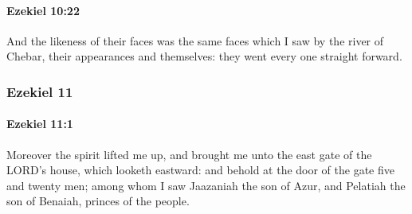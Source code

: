 		\paragraph{Ezekiel 10:22} %
			\label{EZEKIEL-10-22}

			And the likeness of their faces was the same faces which I saw by the river of Chebar, their appearances and themselves: they went every one straight forward.

	\subsubsection{Ezekiel 11} %
		\label{EZEKIEL-11}

		\paragraph{Ezekiel 11:1} %
			\label{EZEKIEL-11-1}

			Moreover the spirit lifted me up, and brought me unto the east gate of the LORD’s house, which looketh eastward: and behold at the door of the gate five and twenty men; among whom I saw Jaazaniah the son of Azur, and Pelatiah the son of Benaiah, princes of the people.

